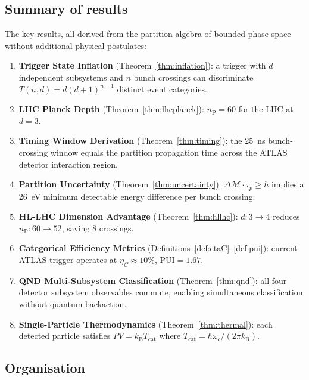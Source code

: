 \documentclass[twocolumn,10pt,a4paper]{article}
\theoremstyle{thmstyle}
\theoremstyle{definition}
\theoremstyle{remark}
\newcommand{\nP}{n_{\mathrm{P}}}
\newcommand{\kB}{k_{\mathrm{B}}}
\newcommand{\etaC}{\eta_{C}}
\newcommand{\PUI}{\mathrm{PUI}}
\begin{document}
\subsection{Summary of results}

The key results, all derived from the partition algebra of bounded phase
space without additional physical postulates:

\begin{enumerate}[nosep,label=(\arabic*)]
\item \textbf{Trigger State Inflation} (Theorem~\ref{thm:inflation}):
a trigger with $d$ independent subsystems and $n$ bunch crossings can
discriminate $T(n,d) = d(d+1)^{n-1}$ distinct event categories.

\item \textbf{LHC Planck Depth} (Theorem~\ref{thm:lhcplanck}):
$\nP = 60$ for the LHC at $d = 3$.

\item \textbf{Timing Window Derivation} (Theorem~\ref{thm:timing}):
the 25~ns bunch-crossing window equals the partition propagation time across
the ATLAS detector interaction region.

\item \textbf{Partition Uncertainty} (Theorem~\ref{thm:uncertainty}):
$\Delta\mathcal{M} \cdot \tau_p \geq \hbar$ implies a 26~eV
minimum detectable energy difference per bunch crossing.

\item \textbf{HL-LHC Dimension Advantage} (Theorem~\ref{thm:hllhc}):
$d : 3 \to 4$ reduces $\nP : 60 \to 52$, saving 8 crossings.

\item \textbf{Categorical Efficiency Metrics}
(Definitions~\ref{def:etaC}--\ref{def:pui}):
current ATLAS trigger operates at $\etaC \approx 10\%$, $\PUI = 1.67$.

\item \textbf{QND Multi-Subsystem Classification}
(Theorem~\ref{thm:qnd}): all four detector subsystem observables commute,
enabling simultaneous classification without quantum backaction.

\item \textbf{Single-Particle Thermodynamics}
(Theorem~\ref{thm:thermal}): each detected particle satisfies
$PV = \kB T_{\mathrm{cat}}$ where $T_{\mathrm{cat}} = \hbar\omega_c/(2\pi\kB)$.
\end{enumerate}

\subsection{Organisation}
\end{document}
